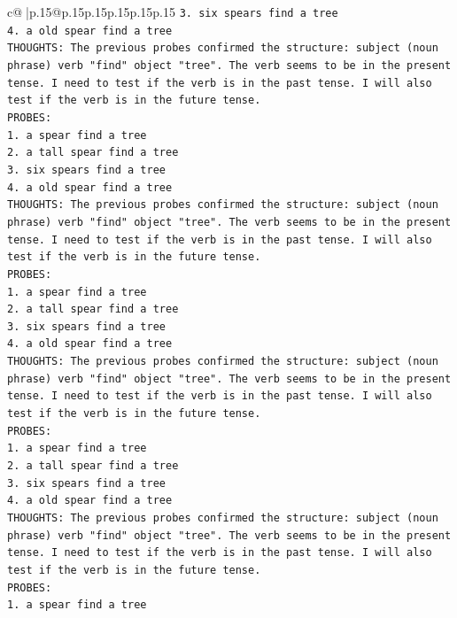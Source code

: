 \documentclass{article}
\begin{document}
{\begin{supertabular}{c@{$\;$}|p{.15\linewidth}@{}p{.15\linewidth}p{.15\linewidth}p{.15\linewidth}p{.15\linewidth}p{.15\linewidth}}
{{{\texttt{3. six spears find a tree} \\
\texttt{4. a old spear find a tree} \\
\texttt{THOUGHTS: The previous probes confirmed the structure: subject (noun phrase) verb "find" object "tree". The verb seems to be in the present tense. I need to test if the verb is in the past tense. I will also test if the verb is in the future tense.} \\
\texttt{PROBES:} \\
\texttt{1. a spear find a tree} \\
\texttt{2. a tall spear find a tree} \\
\texttt{3. six spears find a tree} \\
\texttt{4. a old spear find a tree} \\
\texttt{THOUGHTS: The previous probes confirmed the structure: subject (noun phrase) verb "find" object "tree". The verb seems to be in the present tense. I need to test if the verb is in the past tense. I will also test if the verb is in the future tense.} \\
\texttt{PROBES:} \\
\texttt{1. a spear find a tree} \\
\texttt{2. a tall spear find a tree} \\
\texttt{3. six spears find a tree} \\
\texttt{4. a old spear find a tree} \\
\texttt{THOUGHTS: The previous probes confirmed the structure: subject (noun phrase) verb "find" object "tree". The verb seems to be in the present tense. I need to test if the verb is in the past tense. I will also test if the verb is in the future tense.} \\
\texttt{PROBES:} \\
\texttt{1. a spear find a tree} \\
\texttt{2. a tall spear find a tree} \\
\texttt{3. six spears find a tree} \\
\texttt{4. a old spear find a tree} \\
\texttt{THOUGHTS: The previous probes confirmed the structure: subject (noun phrase) verb "find" object "tree". The verb seems to be in the present tense. I need to test if the verb is in the past tense. I will also test if the verb is in the future tense.} \\
\texttt{PROBES:} \\
\texttt{1. a spear find a tree} \\
}}}
\end{supertabular}}
\end{document}
